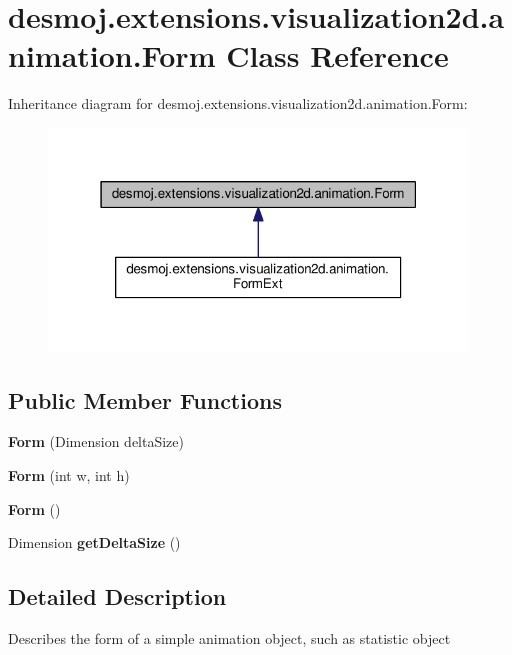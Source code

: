 \section{desmoj.\-extensions.\-visualization2d.\-animation.\-Form Class Reference}
\label{classdesmoj_1_1extensions_1_1visualization2d_1_1animation_1_1_form}


Inheritance diagram for desmoj.\-extensions.\-visualization2d.\-animation.\-Form\-:
\nopagebreak
\begin{figure}[H]
\begin{center}
\leavevmode
\includegraphics[width=316pt]{classdesmoj_1_1extensions_1_1visualization2d_1_1animation_1_1_form__inherit__graph}
\end{center}
\end{figure}
\subsection*{Public Member Functions}
\begin{DoxyCompactItemize}
\item 
{\bf Form} (Dimension delta\-Size)
\item 
{\bf Form} (int w, int h)
\item 
{\bf Form} ()
\item 
Dimension {\bfseries get\-Delta\-Size} ()\label{classdesmoj_1_1extensions_1_1visualization2d_1_1animation_1_1_form_af5f988b24708dd1c5ccdaae35acfd78e}

\end{DoxyCompactItemize}


\subsection{Detailed Description}
Describes the form of a simple animation object, such as statistic object

